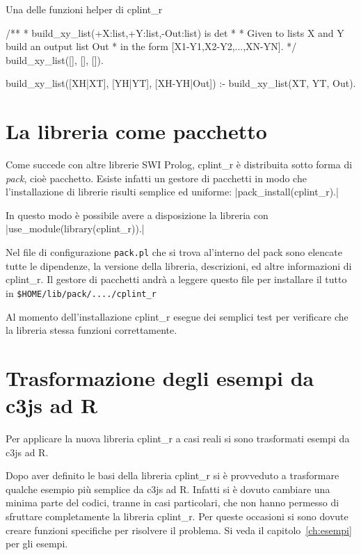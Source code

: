 \documentclass[10pt,titlepage,twoside,a4paper]{report}
\newenvironment{code}{\singlespacing\captionsetup{type=listing}}{}
\begin{document}
\begin{code}
    \caption{Una delle funzioni helper di cplint\_r}
    \label{lst:esempioFunzioneDiSupportoCplintR}
    \begin{prologcode*}{}
/**
 * build_xy_list(+X:list,+Y:list,-Out:list) is det
 *
 * Given to lists X and Y build an output list Out
 * in the form [X1-Y1,X2-Y2,...,XN-YN].
 */
build_xy_list([], [], []).

build_xy_list([XH|XT], [YH|YT], [XH-YH|Out]) :-
        build_xy_list(XT, YT, Out).
    \end{prologcode*}
\end{code}


\section{La libreria come pacchetto}
Come succede con altre librerie SWI Prolog, cplint\_r è distribuita sotto 
forma di \emph{pack}, cioè pacchetto. Esiste infatti un gestore di pacchetti 
in modo che l'installazione di librerie risulti semplice ed uniforme: 
|pack_install(cplint_r).|

In questo modo è possibile avere a disposizione la libreria con 
|use_module(library(cplint_r)).|

Nel file di configurazione \texttt{pack.pl} che si trova al'interno del pack 
sono elencate tutte le dipendenze, la versione della libreria, descrizioni, 
ed altre informazioni di cplint\_r. Il gestore di pacchetti andrà a leggere 
questo file per installare il tutto in \texttt{\$HOME/lib/pack/..../cplint\_r}

Al momento dell'installazione cplint\_r esegue dei semplici 
test per verificare che la libreria stessa funzioni correttamente.


\section{Trasformazione degli esempi da c3js ad R} \label{sec:trasformazione-
degli-esempi-da-c3js-ad-r}
Per applicare la nuova libreria cplint\_r a casi reali si sono trasformati 
esempi da c3js ad R.

Dopo aver definito le basi della libreria cplint\_r si è provveduto a 
trasformare qualche esempio più semplice da c3js ad R. Infatti si è 
dovuto cambiare una minima parte del codici, tranne in casi particolari, che 
non hanno permesso di sfruttare completamente la 
libreria cplint\_r. Per queste occasioni si sono dovute creare funzioni 
specifiche per risolvere il problema. Si veda il capitolo~\ref{ch:esempi} per 
gli esempi.
\end{document}
